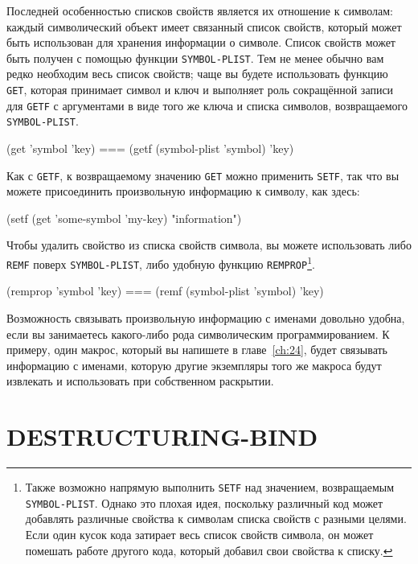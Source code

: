 Последней особенностью списков свойств является их отношение к символам: каждый
символический объект имеет связанный список свойств, который может быть использован для
хранения информации о символе. Список свойств может быть получен с помощью функции
\lstinline{SYMBOL-PLIST}. Тем не менее обычно вам редко необходим весь список свойств; чаще вы
будете использовать функцию \lstinline{GET}, которая принимает символ и ключ и выполняет роль
сокращённой записи для \lstinline{GETF} с аргументами в виде того же ключа и списка символов,
возвращаемого \lstinline{SYMBOL-PLIST}.

\begin{myverb}
(get 'symbol 'key) === (getf (symbol-plist 'symbol) 'key)
\end{myverb}

Как с \lstinline{GETF}, к возвращаемому значению \lstinline{GET} можно применить \lstinline{SETF}, так
что вы можете присоединить произвольную информацию к символу, как здесь:

\begin{myverb}
(setf (get 'some-symbol 'my-key) "information")
\end{myverb}

Чтобы удалить свойство из списка свойств символа, вы можете использовать либо \lstinline{REMF}
поверх \lstinline{SYMBOL-PLIST}, либо удобную функцию \lstinline{REMPROP}\footnote{Также возможно
  напрямую выполнить \lstinline{SETF} над значением, возвращаемым \lstinline{SYMBOL-PLIST}. Однако
  это плохая идея, поскольку различный код может добавлять различные свойства к символам
  списка свойств с разными целями. Если один кусок кода затирает весь список свойств
  символа, он может помешать работе другого кода, который добавил свои свойства к списку.}\hspace{\footnotenegspace}.

\begin{myverb}
(remprop 'symbol 'key) === (remf (symbol-plist 'symbol) 'key)
\end{myverb}

Возможность связывать произвольную информацию с именами довольно удобна, если вы
занимаетесь какого-либо рода символическим программированием. К примеру, один макрос,
который вы напишете в главе~\ref{ch:24}, будет связывать информацию с именами, которую
другие экземпляры того же макроса будут извлекать и использовать при собственном
раскрытии.

\section{DESTRUCTURING-BIND}

